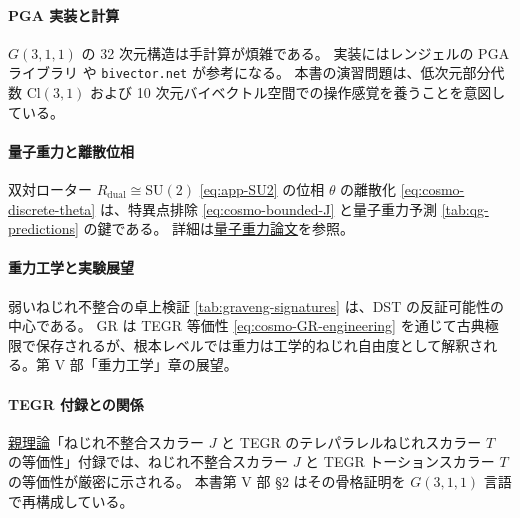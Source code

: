 \documentclass[dvipdfmx,a4paper,oneside]{jsbook}
\numberwithin{equation}{chapter}
\begin{document}
\paragraph{PGA 実装と計算}
\(G(3,1,1)\) の 32 次元構造は手計算が煩雑である。
実装にはレンジェルの PGA ライブラリ \cite{Lengyel2024} や \texttt{bivector.net} \cite{GunnDeKeninck2020} が参考になる。
本書の演習問題は、低次元部分代数 \(\mathrm{Cl}(3,1)\) および 10 次元バイベクトル空間での操作感覚を養うことを意図している。

\paragraph{量子重力と離散位相}
双対ローター \(R_{\mathrm{dual}} \cong \mathrm{SU}(2)\) \eqref{eq:app-SU2} の位相 \(\theta\) の離散化 \eqref{eq:cosmo-discrete-theta} は、特異点排除 \eqref{eq:cosmo-bounded-J} と量子重力予測 \ref{tab:qg-predictions} の鍵である。
詳細は\hyperref[sec:sister-manuscripts]{量子重力論文}を参照。

\paragraph{重力工学と実験展望}
弱いねじれ不整合の卓上検証 \ref{tab:graveng-signatures} は、DST の反証可能性の中心である。
GR は TEGR 等価性 \eqref{eq:cosmo-GR-engineering} を通じて古典極限で保存されるが、根本レベルでは重力は工学的ねじれ自由度として解釈される。第 V 部「重力工学」章の展望。

\paragraph{TEGR 付録との関係}
\hyperref[sec:sister-manuscripts]{親理論}「ねじれ不整合スカラー \(J\) と TEGR のテレパラレルねじれスカラー \(T\) の等価性」付録では、ねじれ不整合スカラー \(J\) と TEGR トーションスカラー \(T\) の等価性が厳密に示される。
本書第 V 部 §2 はその骨格証明を \(G(3,1,1)\) 言語で再構成している。
\end{document}
